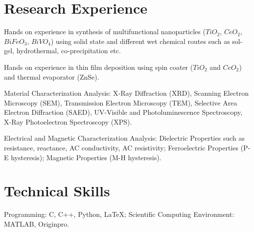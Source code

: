 \documentclass[letterpaper,20pt]{article}
\begin{document}
\vspace{-5pt}
\section{Research Experience}
	\begin{description}[font=$\bullet$]
		\item{Hands on experience in synthesis of multifunctional nanoparticles ($TiO_{2}$, $CeO_{2}$, $BiFeO_{3}$, $BiVO_{4}$) using solid state and different wet chemical routes such as sol-gel, hydrothermal, co-precipitation etc.}
		\vspace{-5pt}
		\item{Hands on experience in thin film deposition using spin coater ($TiO_{2}$ and $CeO_{2}$) and thermal evaporator (ZnSe).}
		\vspace{-5pt}
		\item{Material Characterization Analysis: X-Ray Diffraction (XRD), Scanning Electron Microscopy (SEM), Transmission Electron Microscopy (TEM), Selective Area Electron Diffraction (SAED), UV-Visible and Photoluminescence Spectroscopy, X-Ray Photoelectron Spectroscopy (XPS).}
		\vspace{-5pt}
		\item{Electrical and Magnetic Characterization Analysis: Dielectric Properties such as resistance, reactance, AC conductivity, AC resistivity; Ferroelectric Properties (P-E hysteresis); Magnetic Properties (M-H hysteresis).}
		\vspace{-5pt}
		
	\end{description}
	
\vspace{-5pt}
\section{Technical Skills}
	Programming: C, C++, Python, \LaTeX; Scientific Computing Environment: MATLAB, Originpro.\\ 
	
\end{document}
